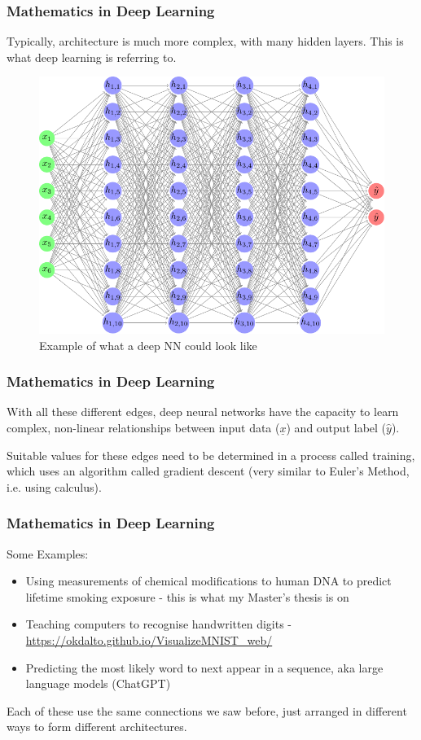 \documentclass{beamer}
\begin{document}
\begin{frame}
    \frametitle{Mathematics in Deep Learning}
    Typically, architecture is much more complex, with many hidden layers. This is what \alert{deep} learning is referring to.

    \begin{figure}
        \centering
        \includegraphics[height=0.5\textheight]{./figures/mlp/main.pdf}
        \caption{Example of what a deep NN could look like}
    \end{figure}
\end{frame}

\begin{frame}
    \frametitle{Mathematics in Deep Learning}
    With all these different edges, deep neural networks have the capacity to learn complex, non-linear relationships between input data (\(\underline{x}\)) and output label (\(\hat{y}\)). \pause
    \vspace{0.5cm}

    Suitable values for these edges need to be determined in a process called training, which uses an algorithm called gradient descent (very similar to \alert{Euler's Method}, i.e. using calculus). 

\end{frame}

\begin{frame}
    \frametitle{Mathematics in Deep Learning}
    Some Examples:
    \begin{itemize}
        \item Using measurements of chemical modifications to human DNA to predict lifetime smoking exposure - this is what my Master's thesis is on \pause
        \item Teaching computers to recognise handwritten digits - \url{https://okdalto.github.io/VisualizeMNIST_web/} \pause
        \item Predicting the most likely word to next appear in a sequence, aka large language models (ChatGPT) \pause
    \end{itemize}

    Each of these use the same connections we saw before, just arranged in different ways to form different \alert{architectures}.
\end{frame}
\end{document}
